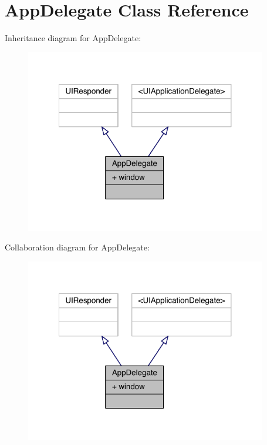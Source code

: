\hypertarget{interface_app_delegate}{\section{App\-Delegate Class Reference}
\label{interface_app_delegate}
}


Inheritance diagram for App\-Delegate\-:\nopagebreak
\begin{figure}[H]
\begin{center}
\leavevmode
\includegraphics[width=299pt]{interface_app_delegate__inherit__graph}
\end{center}
\end{figure}


Collaboration diagram for App\-Delegate\-:\nopagebreak
\begin{figure}[H]
\begin{center}
\leavevmode
\includegraphics[width=299pt]{interface_app_delegate__coll__graph}
\end{center}
\end{figure}
